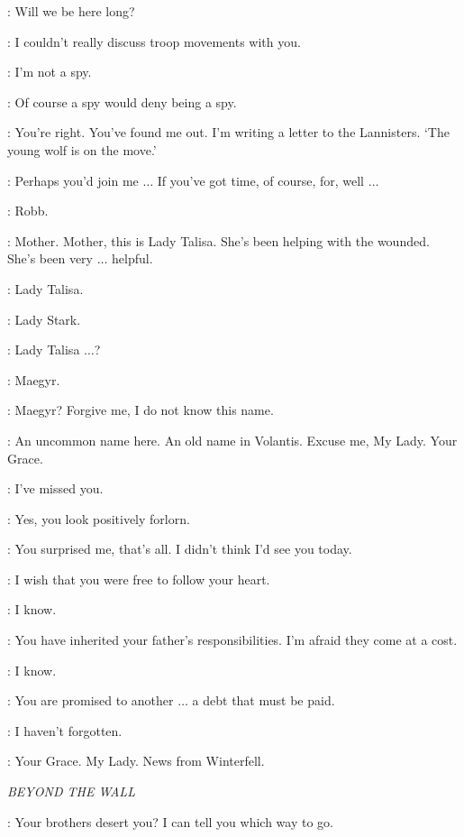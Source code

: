 \TALISA: Will we be here long? 

\ROBB: I couldn't really discuss troop movements with you. 

\TALISA: I'm not a spy. 

\ROBB: Of course a spy would deny being a spy. 

\TALISA: You're right. You've found me out. I'm writing a letter to the Lannisters. `The young wolf is on the move.' 

\ROBB: Perhaps you'd join me $\ldots$ If you've got time, of course, for, well $\ldots$ 


\CATELYN: Robb. 

\ROBB: Mother. Mother, this is Lady Talisa. She's been helping with the wounded. She's been very $\ldots$ helpful. 

\CATELYN: Lady Talisa. 

\TALISA: Lady Stark. 

\CATELYN: Lady Talisa $\ldots$? 

\TALISA: Maegyr. 

\CATELYN: Maegyr? Forgive me, I do not know this name. 

\TALISA: An uncommon name here. An old name in Volantis. Excuse me, My Lady. Your Grace. 

\ROBB: I've missed you. 

\CATELYN: Yes, you look positively forlorn. 

\ROBB: You surprised me, that's all. I didn't think I'd see you today. 

\CATELYN: I wish that you were free to follow your heart. 

\ROBB: I know. 

\CATELYN: You have inherited your father's responsibilities. I'm afraid they come at a cost. 

\ROBB: I know. 

\CATELYN: You are promised to another $\ldots$ a debt that must be paid. 

\ROBB: I haven't forgotten. 


\ROOSE: Your Grace. My Lady. News from Winterfell. 


\scene

\textit{BEYOND THE WALL} 


\YGRITTE: Your brothers desert you? I can tell you which way to go. 

